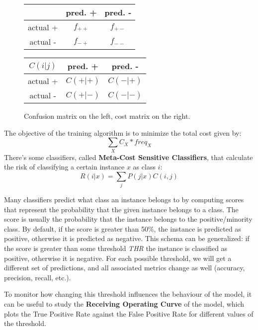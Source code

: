 \begin{figure}[H]
\centering
\begin{minipage}{0.49\textwidth}
\centering
    \begin{tabular}{|c||c|c|}
         \hline
         & pred. + & pred. - \\
        \hline
        \hline
        actual + & $f_{++}$ & $f_{+-}$\\
        \hline
        actual - & $f_{-+}$ & $f_{--}$\\
        \hline
    \end{tabular}
\end{minipage}
\hfill
\begin{minipage}{0.49\textwidth}
\centering
    \begin{tabular}{|c||c|c|}
         \hline
        $C(i|j)$ & pred. + & pred. - \\
        \hline
        \hline
        actual + & $C(+|+)$ & $C(-|+)$\\
        \hline
        actual - & $C(+|-)$ & $C(-|-)$\\
        \hline
    \end{tabular}
\end{minipage}
\caption{Confusion matrix on the left, cost matrix on the right.}
\end{figure}
The objective of the training algorithm is to minimize the total cost given by:
\begin{equation*}
    \sum_X C_X * \textit{freq}_X
\end{equation*}
There's some classifiers, called \textbf{Meta-Cost Sensitive Classifiers}, that calculate the risk of classifying a certain instance $x$ as class $i$:
\begin{equation*}
    R(i|x) = \sum_j P(j|x)C(i,j)
\end{equation*}

Many classifiers predict what class an instance belongs to by computing scores that represent the probability that the given instance belongs to a class. The score is usually the probability that the instance belongs to the positive/minority class. By default, if the score is greater than 50\%, the instance is predicted as positive, otherwise it is predicted as negative. This schema can be generalized: if the score is greater than some threshold \textit{THR} the instance is classified as positive, otherwise it is negative. For each possible threshold, we will get a different set of predictions, and all associated metrics change as well (accuracy, precision, recall, etc.).

To monitor how changing this threshold influences the behaviour of the model, it can be useful to study the \textbf{Receiving Operating Curve} of the model, which plots the True Positive Rate against the False Positive Rate for different values of the threshold.